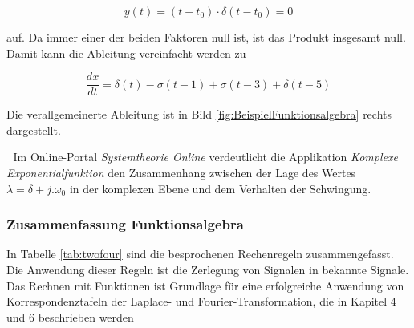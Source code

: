 \begin{equation}\label{eq:onesixtythree}
y\left(t\right)=\left(t-t_{0} \right)\cdot \delta \left(t-t_{0} \right)=0
\end{equation}

\noindent auf. Da immer einer der beiden Faktoren null ist, ist das Produkt insgesamt null. Damit kann die Ableitung vereinfacht werden zu 

\begin{equation}\label{eq:onesixtyfour}
\dfrac{dx}{dt} =\delta \left(t\right)-\sigma \left(t-1\right)+\sigma \left(t-3\right)+\delta \left(t-5\right)
\end{equation}

\noindent Die verallgemeinerte Ableitung ist in Bild \ref{fig:BeispielFunktionsalgebra} rechts dargestellt.

\noindent 
\noindent
\noindent


\textcolor{white}{.}\newline
\noindent Im Online-Portal \textit{Systemtheorie Online} verdeutlicht die Applikation \textit{Komplexe Exponentialfunktion} den Zusammenhang zwischen der Lage des Wertes $\lambda = \delta + j.\omega{}_{0}$ in der komplexen Ebene und dem Verhalten der Schwingung.\newline


\noindent 


\subsubsection{ Zusammenfassung Funktionsalgebra}

\noindent In Tabelle \ref{tab:twofour} sind die besprochenen Rechenregeln zusammengefasst. Die Anwendung dieser Regeln ist die Zerlegung von Signalen in bekannte Signale. Das Rechnen mit Funktionen ist Grundlage für eine erfolgreiche Anwendung von Korrespondenztafeln der Laplace- und Fourier-Transformation, die in Kapitel 4 und 6 beschrieben werden 

\clearpage

